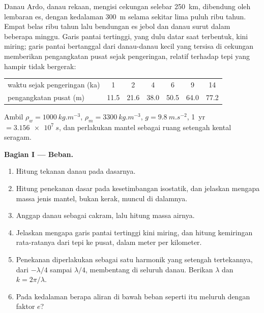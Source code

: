 \begin{problem}
\label{pb:b3:mantle-convection:1}
Danau Ardo, danau rekaan, mengisi cekungan selebar \qty{250}{km}, dibendung oleh
lembaran es, dengan kedalaman \qty{300}{m} selama sekitar lima puluh ribu tahun. Empat belas
ribu tahun lalu bendungan es jebol dan danau surut dalam beberapa minggu.
Garis pantai tertinggi, yang dulu datar saat terbentuk, kini miring; garis pantai
bertanggal dari danau-danau kecil yang tersisa di cekungan memberikan pengangkatan pusat
sejak pengeringan, relatif terhadap tepi yang hampir tidak bergerak:

\smallskip
\begin{center}\small
\begin{tabular}{lcccccc}
\hline
waktu sejak pengeringan (ka) & 1 & 2 & 4 & 6 & 9 & 14\\
pengangkatan pusat (m) & 11.5 & 21.6 & 38.0 & 50.5 & 64.0 & 77.2\\
\hline
\end{tabular}
\end{center}
\smallskip

Ambil $\rho_w = \qty{1000}{kg.m^{-3}}$, $\rho_m = \qty{3300}{kg.m^{-3}}$, $g =
\qty{9.8}{m.s^{-2}}$, \qty{1}{yr} $= \qty{3.156e7}{s}$, dan perlakukan mantel sebagai
ruang setengah kental seragam.

\medskip\noindent\textbf{Bagian I --- Beban.}
\begin{enumerate}
  \item Hitung tekanan danau pada dasarnya.
  \item Hitung penekanan dasar pada kesetimbangan isostatik, dan jelaskan
        mengapa massa jenis mantel, bukan kerak, muncul di dalamnya.
  \item Anggap danau sebagai cakram, lalu hitung massa airnya.
  \item Jelaskan mengapa garis pantai tertinggi kini miring, dan hitung kemiringan
        rata-ratanya dari tepi ke pusat, dalam meter per kilometer.
  \item Penekanan diperlakukan sebagai satu harmonik yang setengah tertekannya, dari
        $-\lambda/4$ sampai $\lambda/4$, membentang di seluruh danau. Berikan $\lambda$ dan $k =
        2\pi/\lambda$.
  \item Pada kedalaman berapa aliran di bawah beban seperti itu meluruh dengan faktor
        $e$?
\end{enumerate}


\end{problem}
